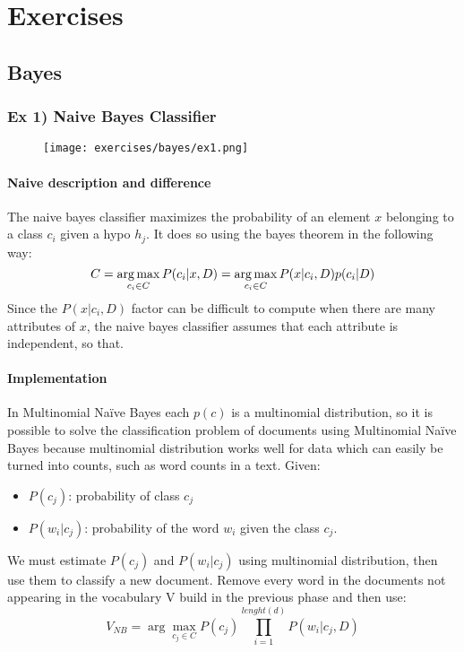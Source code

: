 
\newcommand{\argmaxs}[2]{\arg \max_{#2}{#1}}

\section{Exercises}

\subsection{Bayes}

\subsubsection{Ex 1) Naive Bayes Classifier}

\begin{figure}[H]
    \centering
   \texttt{[image: exercises/bayes/ex1.png]}
\end{figure}


\paragraph{Naive description and difference}
The naive bayes classifier maximizes the probability of an element $x$ belonging to a class $c_i$ given a hypo $h_j$. It does so using the  bayes theorem in the following way:
$$C=\operatorname*{arg\,max}_{c_i \in C}P(c_i|x,D) = \operatorname*{arg\,max}_{c_i \in C}P(x| c_i,D)p(c_i|D)$$
Since the $P(x| c_i,D)$ factor can be difficult to compute when there are many attributes of $x$, the naive bayes classifier assumes that each attribute is independent, so that.

\paragraph{Implementation }
In Multinomial Naïve Bayes each $p(c)$ is a multinomial distribution, so it is possible to solve the classification problem of documents using Multinomial Naïve Bayes because multinomial distribution works well for data which can easily be turned into counts, such as word counts in a text.
Given:
\begin{itemize}
\item $P(c_j)$: probability of class $c_j$
\item $P(w_i|c_j)$: probability of the word $w_i$ given the class $c_j$.
\end{itemize}
We must estimate $P(c_j)$ and $P(w_i|c_j)$ using multinomial distribution, then use them to classify a new document. Remove every word in the documents not appearing in the vocabulary V build in the previous phase and then use:
\[V_{NB}=\argmaxs{P(c_j)\prod_{i=1}^{lenght(d)}P(w_i|c_j,D)}{c_j \in C}\]


